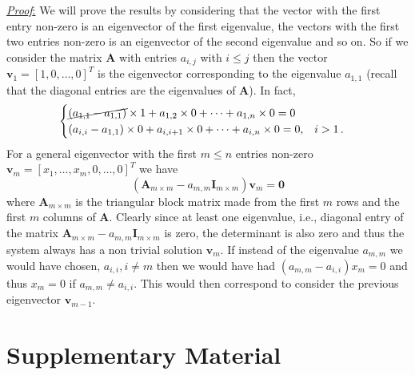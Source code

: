 \documentclass[prx,twocolumn,amsmath,noshowkeys,noshowpacs,amssymb]{revtex4-2}
\begin{document}
\underline{\textit{Proof}:} We will prove the results by considering that the vector with the first entry non-zero is an eigenvector of the first eigenvalue, the vectors with the first two entries non-zero is an eigenvector of the second eigenvalue and so on. So if we consider the matrix $\textbf{A}$ with entries $a_{i,j}$ with $i\leq j$ then the vector $\mathbf{v}_1= \left[1,0,\dots,0 \right]^T$ is the eigenvector corresponding to the eigenvalue $a_{1,1}$ (recall that the diagonal entries are the eigenvalues of $\textbf{A}$). In fact,  
\begin{equation*}
\begin{cases}
\cancel{\left(a_{1,1}-a_{1,1}\right)}\times 1+a_{1,2}\times 0+\dots+a_{1,n}\times 0=0\\
\left(a_{i,i}-a_{1,1}\right)\times 0+a_{i,i+1}\times 0+\dots+ a_{i,n}\times 0=0, \;\;\; i>1\,.
\end{cases}
\end{equation*}
For a general eigenvector with the first $m\leq n$ entries non-zero $\mathbf{v}_m= \left[x_1,\dots, x_m, 0,\dots,0 \right]^T$ we have
\begin{equation*}
\left(\mathbf{A}_{m\times m}-a_{m,m}\mathbf{I}_{m\times m}\right)\mathbf{v}_m=\mathbf{0}
\end{equation*}
where $\mathbf{A}_{m\times m}$ is the triangular block matrix made from the first $m$ rows and the first $m$ columns of $\textbf{A}$. Clearly since at least one eigenvalue, i.e., diagonal entry of the matrix $\mathbf{A}_{m\times m}-a_{m,m}\mathbf{I}_{m\times m}$ is zero, the determinant is also zero and thus the system always has a non trivial solution $\mathbf{v}_m$. If instead of the eigenvalue $a_{m,m}$ we would have chosen, $a_{i,i}, i\neq m$ then we would have had $\left(a_{m,m}-a_{i,i}\right)x_m=0$ and thus $x_m=0$ if $a_{m,m}\neq a_{i,i}$. This would then correspond to consider the previous eigenvector $\mathbf{v}_{m-1}$. %





\clearpage


\section*{Supplementary Material}
\end{document}

